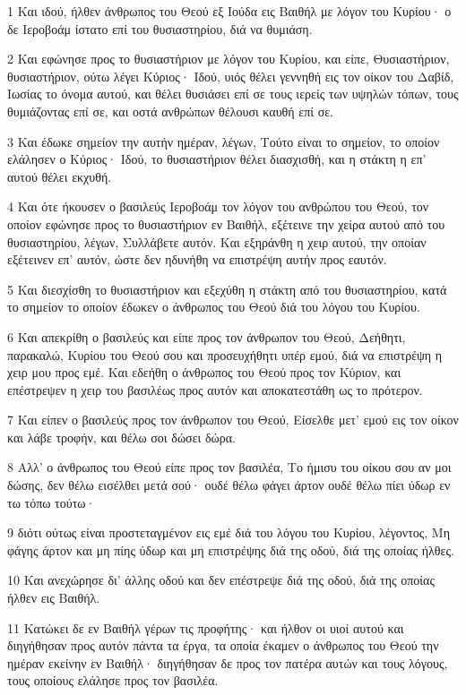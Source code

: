 \par 1 Και ιδού, ήλθεν άνθρωπος του Θεού εξ Ιούδα εις Βαιθήλ με λόγον του Κυρίου· ο δε Ιεροβοάμ ίστατο επί του θυσιαστηρίου, διά να θυμιάση.
\par 2 Και εφώνησε προς το θυσιαστήριον με λόγον του Κυρίου, και είπε, Θυσιαστήριον, θυσιαστήριον, ούτω λέγει Κύριος· Ιδού, υιός θέλει γεννηθή εις τον οίκον του Δαβίδ, Ιωσίας το όνομα αυτού, και θέλει θυσιάσει επί σε τους ιερείς των υψηλών τόπων, τους θυμιάζοντας επί σε, και οστά ανθρώπων θέλουσι καυθή επί σε.
\par 3 Και έδωκε σημείον την αυτήν ημέραν, λέγων, Τούτο είναι το σημείον, το οποίον ελάλησεν ο Κύριος· Ιδού, το θυσιαστήριον θέλει διασχισθή, και η στάκτη η επ' αυτού θέλει εκχυθή.
\par 4 Και ότε ήκουσεν ο βασιλεύς Ιεροβοάμ τον λόγον του ανθρώπου του Θεού, τον οποίον εφώνησε προς το θυσιαστήριον εν Βαιθήλ, εξέτεινε την χείρα αυτού από του θυσιαστηρίου, λέγων, Συλλάβετε αυτόν. Και εξηράνθη η χειρ αυτού, την οποίαν εξέτεινεν επ' αυτόν, ώστε δεν ηδυνήθη να επιστρέψη αυτήν προς εαυτόν.
\par 5 Και διεσχίσθη το θυσιαστήριον και εξεχύθη η στάκτη από του θυσιαστηρίου, κατά το σημείον το οποίον έδωκεν ο άνθρωπος του Θεού διά του λόγου του Κυρίου.
\par 6 Και απεκρίθη ο βασιλεύς και είπε προς τον άνθρωπον του Θεού, Δεήθητι, παρακαλώ, Κυρίου του Θεού σου και προσευχήθητι υπέρ εμού, διά να επιστρέψη η χειρ μου προς εμέ. Και εδεήθη ο άνθρωπος του Θεού προς τον Κύριον, και επέστρεψεν η χειρ του βασιλέως προς αυτόν και αποκατεστάθη ως το πρότερον.
\par 7 Και είπεν ο βασιλεύς προς τον άνθρωπον του Θεού, Είσελθε μετ' εμού εις τον οίκον και λάβε τροφήν, και θέλω σοι δώσει δώρα.
\par 8 Αλλ' ο άνθρωπος του Θεού είπε προς τον βασιλέα, Το ήμισυ του οίκου σου αν μοι δώσης, δεν θέλω εισέλθει μετά σού· ουδέ θέλω φάγει άρτον ουδέ θέλω πίει ύδωρ εν τω τόπω τούτω·
\par 9 διότι ούτως είναι προστεταγμένον εις εμέ διά του λόγου του Κυρίου, λέγοντος, Μη φάγης άρτον και μη πίης ύδωρ και μη επιστρέψης διά της οδού, διά της οποίας ήλθες.
\par 10 Και ανεχώρησε δι' άλλης οδού και δεν επέστρεψε διά της οδού, διά της οποίας ήλθεν εις Βαιθήλ.
\par 11 Κατώκει δε εν Βαιθήλ γέρων τις προφήτης· και ήλθον οι υιοί αυτού και διηγήθησαν προς αυτόν πάντα τα έργα, τα οποία έκαμεν ο άνθρωπος του Θεού την ημέραν εκείνην εν Βαιθήλ· διηγήθησαν δε προς τον πατέρα αυτών και τους λόγους, τους οποίους ελάλησε προς τον βασιλέα.
